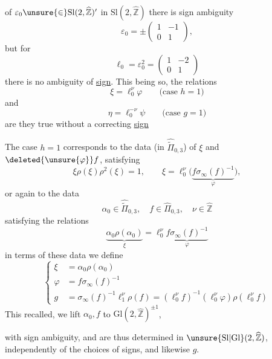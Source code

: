 of $\varepsilon_0\unsure{\in}\mathrm{Sl}(2,\widehat{\mathbb Z})'$ in $\mathrm{Sl}(2,\widehat{\mathbb Z})$ there is sign ambiguity
\[
 \varepsilon_0=\pm\begin{pmatrix}1&-1\\0&1\end{pmatrix},
\]
but for
\[
 \ell_0=\varepsilon_0^2=\begin{pmatrix}1&-2\\0&1\end{pmatrix}
 \tag{39}
\]
there is no ambiguity of \uline{sign}. This being so, the relations
\[
 \xi=\ell_0^\nu\varphi\qquad\text{(case }h=1\text{)}
 \tag{40}
\]
and
\[
 \eta=\ell_0^{-\nu}\psi\qquad\text{(case }g=1\text{)}
 \tag{41}
\]
are they true without a correcting \uline{sign} 

The case $h=1$ corresponds to the data (in $\widehat{\widetilde{\Pi}}_{0,3}$) of $\xi$ and $\deleted{\unsure{\varphi}}f$,  satisfying
\[
 \xi\rho(\xi)\rho^2(\xi)=1,\qquad
 \xi=\ell_0^\nu
 \bigl(\underbrace{f\sigma_\infty(f)^{-1}}_{\varphi}\bigr),
\]
or again to the data
\[
 \alpha_0\in\widehat{\widetilde{\Pi}}_{0,3},\quad
 f\in\widehat{\Pi}_{0,3},\quad\nu\in\widehat{\mathbb Z}
\]
satisfying the relations
\[
 \underbrace{\alpha_0\rho(\alpha_0)}_{\xi}
 =\ell_0^\nu\underbrace{f\sigma_\infty(f)^{-1}}_{\varphi}
 \tag{42}
\]
in terms of these data we define
\[
 \left\{\begin{aligned}
 \xi&=\alpha_0\rho(\alpha_0)\\
 \varphi&=f\sigma_\infty(f)^{-1}\\
 g&=\sigma_\infty(f)^{-1}\ell_1^\nu\rho(f)
 =(\ell_0^\nu f)^{-1}(\ell_0^\nu\varphi)\rho(\ell_0^\nu f)
 \end{aligned}\right.
 \tag{43}
\]
This recalled, we lift $\alpha_0,f$ to $\mathrm{Gl}(2,\widehat{\mathbb Z})^{\pm1}$,


with sign ambiguity,  and  are thus determined in $\unsure{\mathrm{Sl}|\mathrm{Gl}}(2,\widehat{\mathbb Z})$, independently of the choices of signs,  and likewise $g$.

